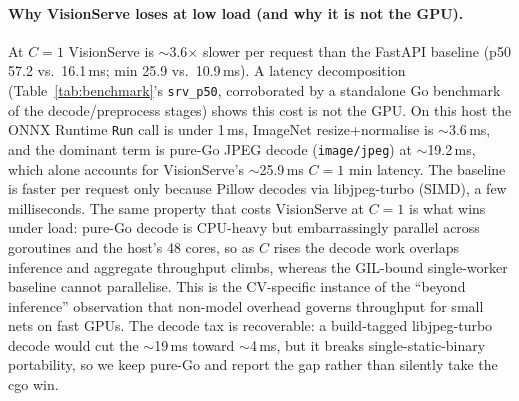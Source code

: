 \paragraph{Why VisionServe loses at low load (and why it is not the GPU).}
At $C{=}1$ VisionServe is
$\sim$3.6$\times$ slower per request than the FastAPI baseline (p50 57.2 vs.\ 16.1\,ms;
min 25.9 vs.\ 10.9\,ms).  A latency decomposition (Table~\ref{tab:benchmark}'s
\texttt{srv\_p50}, corroborated by a standalone Go benchmark of the decode/preprocess
stages) shows this cost is not the GPU.  On this host the ONNX Runtime
\texttt{Run} call is under 1\,ms, ImageNet resize+normalise is $\sim$3.6\,ms, and the
dominant term is pure-Go JPEG decode (\texttt{image/jpeg}) at $\sim$19.2\,ms, which
alone accounts for VisionServe's $\sim$25.9\,ms $C{=}1$ min latency.  The baseline
is faster per request only because Pillow decodes via libjpeg-turbo (SIMD), a few
milliseconds.  The same property that costs VisionServe at $C{=}1$ is what wins
under load: pure-Go decode is CPU-heavy but embarrassingly parallel across goroutines and
the host's 48 cores, so as $C$ rises the decode work overlaps inference and aggregate
throughput climbs, whereas the GIL-bound single-worker baseline cannot parallelise.  This
is the CV-specific instance of the ``beyond inference'' observation that non-model overhead
governs throughput for small nets on fast GPUs.  The decode tax is recoverable: a
build-tagged libjpeg-turbo decode would cut the $\sim$19\,ms toward $\sim$4\,ms, but it
breaks single-static-binary portability, so we keep pure-Go and report the gap rather than
silently take the cgo win.

